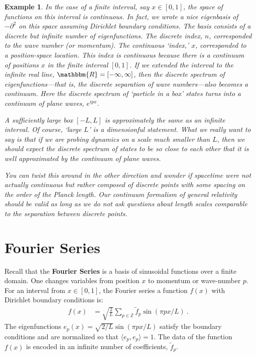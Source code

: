 \documentclass[
  11pt,
	colorful,
	raggedright,
]{tufte-style-thesis-flip}
\newtheorem{example}{Example}[section]
\begin{document}
\begin{example}
In the case of a finite interval, say $x\in [0,1]$, the space of functions on this interval is continuous. In fact, we wrote a nice eigenbasis of $-\partial^2$ on this space assuming Dirichlet boundary conditions. The basis consists of a discrete but infinite number of eigenfunctions. The discrete index, $n$, corresponded to the wave number (or momentum). The continuous `index,' $x$, corresponded to a position-space location. This index is continuous because there is a continuum of positions $x$ in the finite interval $[0,1]$. If we extended the interval to the infinite real line, $\mathbbm{R} = [-\infty, \infty]$, then the discrete spectrum of eigenfunctions---that is, the discrete separation of wave numbers---also becomes a continuum. Here the discrete spectrum of `particle in a box' states turns into a continuum of plane waves, $e^{ipx}$. 

A sufficiently large box $[-L,L]$ is approximately the same as an infinite interval. Of course, `large $L$' is a dimensionful statement. What we really want to say is that if we are probing dynamics on a scale much smaller than $L$, then we should expect the discrete spectrum of states to be so close to each other that it is well approximated by the continuum of plane waves. 

You can twist this around in the other direction and wonder if spacetime were not actually continuous but rather composed of discrete points with some spacing on the order of the Planck length. Our continuum formalism of general relativity should be valid as long as we do not ask questions about length scales comparable to the separation between discrete points. 
\end{example}

\section{Fourier Series}

Recall that the \textbf{Fourier Series} is a basis of sinusoidal functions over a finite domain. One changes variables from position $x$ to momentum or wave-number $p$. For an interval from $x\in [0,1]$, the Fourier series a function $f(x)$ with Dirichlet boundary conditions is:
\begin{align}
  f(x) &= \sqrt{\frac{2}{L}} 
  \sum_{p \in \mathbb{Z}}  
  \tilde f_p \sin(\pi p x/L) \ .
\end{align}
The eigenfunctions $e_p(x)=\sqrt{2/L}\sin(\pi p x/L)$ satisfy the boundary conditions and are normalized so that $\langle e_p,e_p\rangle = 1$. The data of the function $f(x)$ is encoded in an infinite number of coefficients, $\tilde f_p$.
\end{document}
